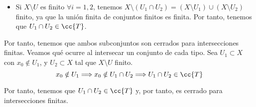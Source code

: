 \begin{ejercicio}
\begin{enumerate}
\begin{itemize}
            \item Si $X\setminus U$ es finito $\forall i=1,2$, tenemos $X\setminus (U_1\cap U_2)=(X\setminus U_1)\cup (X\setminus U_2)$ finito, ya que la unión finita de conjuntos finitos es finita. Por tanto, tenemos que $U_1\cap U_2\in \cc{T}$.
        \end{itemize}
        
        Por tanto, tenemos que ambos subconjuntos son cerrados para intersecciones finitas. Veamos qué ocurre al intersecar un conjunto de cada tipo. Sea $U_1\subset X$ con $x_0\notin U_1$, y $U_2\subset X$ tal que $X\setminus U$ finito.
        \begin{equation*}
            x_0\notin U_1\Longrightarrow x_0\notin U_1\cap U_2 \Longrightarrow U_1\cap U_2\in \cc{T}
        \end{equation*}

        Por tanto, tenemos que $U_1\cap U_2\in \cc{T}$ y, por tanto, es cerrado para intersecciones finitas.
    \end{enumerate}
\end{ejercicio}

